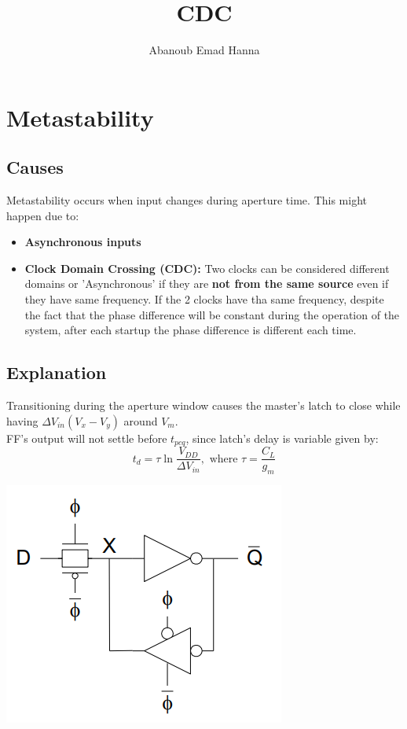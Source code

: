 \documentclass[11pt]{article}
\title{CDC}
\author{Abanoub Emad Hanna}
\date{}
\begin{document}
\maketitle

\section*{Metastability}
\subsection*{Causes}
Metastability occurs when input changes during aperture time. This might happen due to:
\begin{itemize}
    \item 
    \textbf{Asynchronous inputs}
    \item \textbf{Clock Domain Crossing (CDC):} Two clocks can be considered different domains or 'Asynchronous' if they are \textbf{not from the same source} even if they have same frequency. If the 2 clocks have tha same frequency, despite the fact that the phase difference will be constant during the operation of the system, after each startup the phase difference is different each time.
\end{itemize}

\subsection*{Explanation}
\begin{minipage}[t]{0.6\textwidth}
    \vspace*{-95pt}
    Transitioning during the aperture window causes the master's latch to close while having \(\Delta V_{in} (V_x - V_y)\) around $V_m$.\\
    FF's output will not settle before \(t_{pcq}\), since latch's delay is variable given by:
    \[
        t_d = \tau \ln\frac{V_{DD}}{\Delta V_{in}}, \text{ where } \tau=\frac{C_L}{g_m}
    \]
\end{minipage}%
\hfill
\begin{minipage}[t]{0.35\textwidth}
    \centering
    \includegraphics[scale=0.55]{1.png}
\end{minipage}
\end{document}
